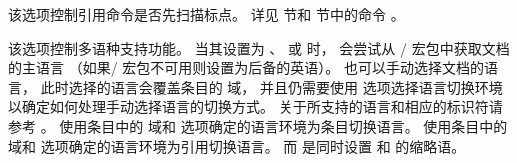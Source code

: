 \begin{optionlist}


该选项控制引用命令是否先扫描标点。
详见  节和  节中的命令 。



该选项控制多语种支持功能。
当其设置为 、 或  时，
\biblatex 会尝试从 / 宏包中获取文档的主语言
（如果/ 宏包不可用则设置为后备的英语）。
也可以手动选择文档的语言，
此时选择的语言会覆盖条目的  域，
并且仍需要使用  选项选择语言切换环境以确定如何处理手动选择语言的切换方式。
关于所支持的语言和相应的标识符请参考 。
 使用条目中的  域和  选项确定的语言环境为条目切换语言。
 使用条目中的  域和  选项确定的语言环境为引用切换语言。
而  是同时设置  和  的缩略语。




\end{optionlist}
